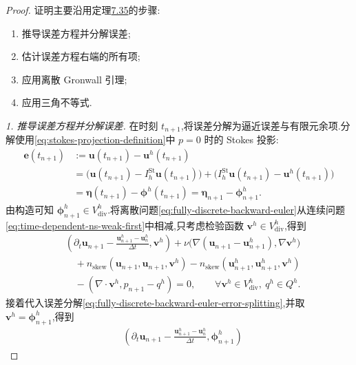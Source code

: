 \begin{proof}
证明主要沿用定理\hyperref[thm:time-dependent-fem-velocity-error]{7.35}的步骤:
\begin{enumerate}
  \item 推导误差方程并分解误差;
  \item 估计误差方程右端的所有项;
  \item 应用离散 Gronwall 引理;
  \item 应用三角不等式.
\end{enumerate}

\textit{1. 推导误差方程并分解误差.} 在时刻 $t_{n+1}$,将误差分解为逼近误差与有限元余项.分解使用\cref{eq:stokes-projection-definition}中 $p=0$ 时的 Stokes 投影:
\begin{equation}\label{eq:fully-discrete-backward-euler-error-splitting}
\begin{aligned}
 \bm{e}(t_{n+1})
  &:=\bm{u}(t_{n+1})-\bm{u}^h(t_{n+1})\\
  &=\bigl(\bm{u}(t_{n+1})-I_h^{\mathrm{St}}\bm{u}(t_{n+1})\bigr)
    +\bigl(I_h^{\mathrm{St}}\bm{u}(t_{n+1})-\bm{u}^h(t_{n+1})\bigr)\\
  &=\symbf{\eta}(t_{n+1})-\symbf{\phi}^h(t_{n+1})
    =\symbf{\eta}_{n+1}-\symbf{\phi}_{n+1}^h.
\end{aligned}
\end{equation}
由构造可知 $\symbf{\phi}_{n+1}^h\in V_{\mathrm{div}}^h$.将离散问题\cref{eq:fully-discrete-backward-euler}从连续问题\cref{eq:time-dependent-ns-weak-first}中相减,只考虑检验函数 $\bm{v}^h\in V_{\mathrm{div}}^h$,得到
\[
\begin{aligned}
 &\left(\partial_t\bm{u}_{n+1}
     -\frac{\bm{u}_{n+1}^h-\bm{u}_n^h}{\Delta t},\bm{v}^h\right)
   +\nu\bigl(\nabla(\bm{u}_{n+1}-\bm{u}_{n+1}^h),\nabla\bm{v}^h\bigr)\\
 &\quad+n_{\mathrm{skew}}(\bm{u}_{n+1},\bm{u}_{n+1},\bm{v}^h)
       -n_{\mathrm{skew}}(\bm{u}_{n+1}^h,\bm{u}_{n+1}^h,\bm{v}^h)\\
 &\quad-(\nabla\cdot\bm{v}^h,p_{n+1}-q^h)=0,
       \qquad\forall\bm{v}^h\in V_{\mathrm{div}}^h,\ q^h\in Q^h.
\end{aligned}
\]
接着代入误差分解\cref{eq:fully-discrete-backward-euler-error-splitting},并取 $\bm{v}^h=\symbf{\phi}_{n+1}^h$,得到
\begin{equation}\label{eq:fully-discrete-backward-euler-error-equation-projected}
\begin{aligned}
 &\left(\partial_t\bm{u}_{n+1}
     -\frac{\bm{u}_{n+1}^h-\bm{u}_n^h}{\Delta t},
          \symbf{\phi}_{n+1}^h\right)

\end{aligned}
\end{equation}
\end{proof}
